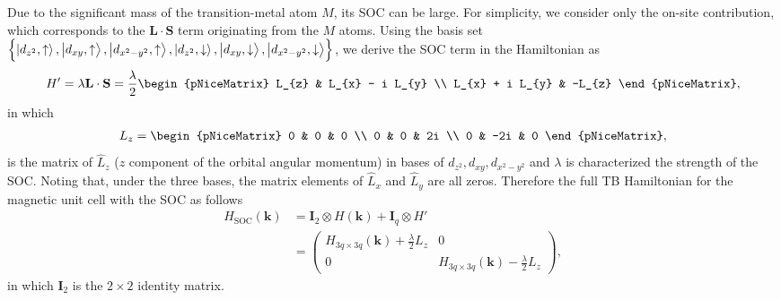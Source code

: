 \documentclass{report}
\newcommand{\f}[2]{\dfrac{#1}{#2}}
\begin{document}
\newpage
Due to the significant mass of the transition-metal atom $M$, its \ac{SOC} can be large. For simplicity, we consider only the on-site contribution, which corresponds to the $\mathbf{L \cdot S}$ term originating from the $M$ atoms. Using the basis set $\left\{\ket{d_{z^{2}},\uparrow},\ket{d_{xy},\uparrow},\ket{d_{x^{2} - y^{2}},\uparrow},\ket{d_{z^{2}},\downarrow},\ket{d_{xy},\downarrow},\ket{d_{x^{2} - y^{2}},\downarrow}\right\}$, we derive the SOC term in the Hamiltonian as
\begin{gather}
	H{'}
	= \lambda \mathbf{L \cdot S}
	= \f{\lambda}{2}
	\begin{pNiceMatrix}
		L_{z}           & L_{x} - i L_{y} \\
		L_{x} + i L_{y} & -L_{z}
	\end{pNiceMatrix},
\end{gather}
in which
\begin{gather}
	L_{z}
	=
	\begin{pNiceMatrix}
		0 & 0   & 0  \\
		0 & 0   & 2i \\
		0 & -2i & 0
	\end{pNiceMatrix},
\end{gather}
is the matrix of $\hat{L}_{z}$ ($z$ component of the orbital angular momentum) in bases of $d_{z^{2}},d_{xy},d_{x^{2} - y^{2}}$ and $\lambda$ is characterized the strength of the \ac{SOC}. Noting that, under the three bases, the matrix elements of $\hat{L}_{x}$ and $\hat{L}_{y}$ are all zeros. Therefore the full \ac{TB} Hamiltonian for the magnetic unit cell with the SOC as follows
\begin{equation}
	\begin{aligned}
		H_{\text{SOC}}(\mathbf{k})
		 & = \mathbf{I}_{2} \otimes H(\mathbf{k}) + \mathbf{I}_{q} \otimes H{'} \\
		 & =
		\begin{pmatrix}
			H_{3q \times 3q}(\mathbf{k}) + \frac{\lambda}{2} L_{z} & 0                                                      \\
			0                                                      & H_{3q \times 3q}(\mathbf{k}) - \frac{\lambda}{2} L_{z}
		\end{pmatrix},
	\end{aligned}
\end{equation}
in which $\mathbf{I}_{2}$ is the $2\times 2$ identity matrix.
\end{document}
